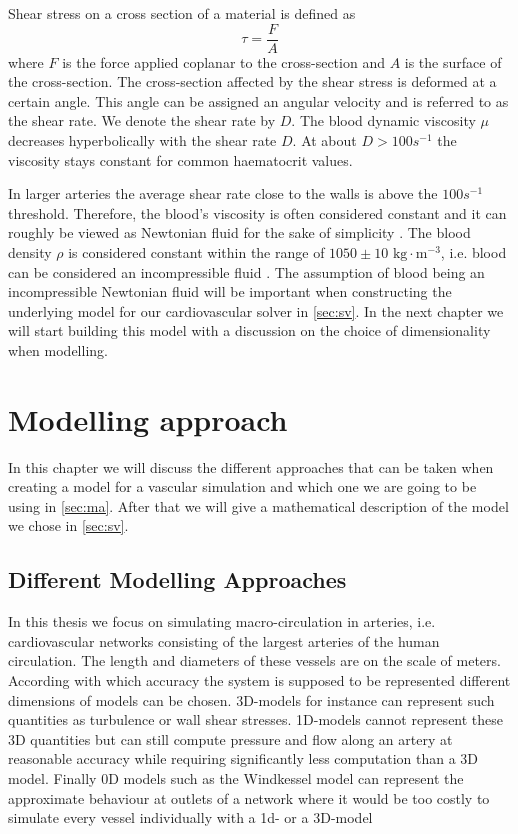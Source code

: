 \documentclass[a4paper, oneside]{discothesis}
\begin{document}
Shear stress on a cross section of a material is defined as 
\begin{equation}
	\tau = \frac{F}{A}
\end{equation}
where $F$ is the force applied coplanar to the cross-section and $A$ is the surface of the cross-section.
The cross-section affected by the shear stress is deformed at a certain angle. 
This angle can be assigned an angular velocity and is referred to as the shear rate.
We denote the shear rate by $D$. \cite{köppl2023dimension}
The blood dynamic viscosity $\mu$ decreases hyperbolically with the shear rate $D$.
At about $D > 100s^{-1}$ the viscosity stays constant for common haematocrit values.

In larger arteries the average shear rate close to the walls is above the $100s^{-1}$ threshold. \cite{MCDbook}
Therefore, the blood's viscosity is often considered constant and it can roughly be viewed as Newtonian fluid for the sake of simplicity \cite{fung1996biomechanics,guyton2006textbook,MCDbook,pedley_1980,zamir2000physics,zamir2006physics}. 
The blood density $\rho$ is considered constant within the range of $1050 \pm 10 \text{ kg}\cdot\text{m}^{-3}$, i.e. blood can be considered an incompressible fluid \cite{PMID:2658951,kenner1977continuous,helmig1997multiphase}.
The assumption of blood being an incompressible Newtonian fluid will be important when constructing the underlying model for our cardiovascular solver in \autoref{sec:sv}. In the next chapter we will start building this model with a discussion on the choice of dimensionality when modelling.

\chapter{Modelling approach} \label{chap:1dm}
In this chapter we will discuss the different approaches that can be taken when creating a model for a vascular simulation and which one we are going to be using in \autoref{sec:ma}.
After that we will give a mathematical description of the model we chose in \autoref{sec:sv}.

\section{Different Modelling Approaches} \label{sec:ma}
In this thesis we focus on simulating macro-circulation in arteries, i.e. cardiovascular networks consisting of the largest arteries of the human circulation.
The length and diameters of these vessels are on the scale of meters.
According with which accuracy the system is supposed to be represented different dimensions of models can be chosen.
3D-models for instance can represent such quantities as turbulence or wall shear stresses.
1D-models cannot represent these 3D quantities but can still compute pressure and flow along an artery at reasonable accuracy while requiring significantly less computation than a 3D model.
Finally 0D models such as the Windkessel model can represent the approximate behaviour at outlets of a network where it would be too costly to simulate every vessel individually with a 1d- or a 3D-model
\end{document}
